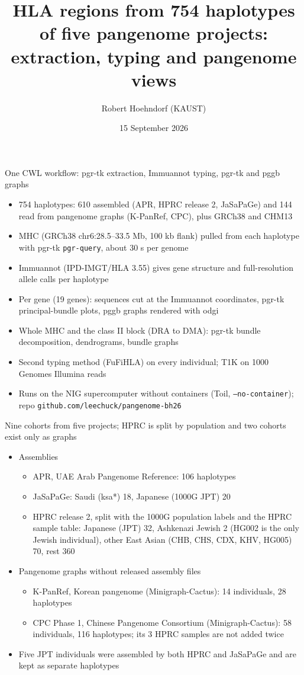 \documentclass[aspectratio=169,11pt]{beamer}
\title{HLA regions from 754 haplotypes of five pangenome projects: extraction, typing and pangenome views}
\author{Robert Hoehndorf (KAUST)}
\institute{BioHackathon Japan 2026, HLA/pangenome group}
\date{15 September 2026}
\begin{document}
\begin{frame}
  \titlepage
\end{frame}

\begin{frame}{One CWL workflow: pgr-tk extraction, Immuannot typing, pgr-tk and pggb graphs}
  \begin{itemize}
    \item 754 haplotypes: 610 assembled (APR, HPRC release 2, JaSaPaGe) and 144 read from pangenome graphs (K-PanRef, CPC), plus GRCh38 and CHM13
    \item MHC (GRCh38 chr6:28.5--33.5 Mb, 100 kb flank) pulled from each haplotype with pgr-tk \texttt{pgr-query}, about 30 s per genome
    \item Immuannot (IPD-IMGT/HLA 3.55) gives gene structure and full-resolution allele calls per haplotype
    \item Per gene (19 genes): sequences cut at the Immuannot coordinates, pgr-tk principal-bundle plots, pggb graphs rendered with odgi
    \item Whole MHC and the class II block (DRA to DMA): pgr-tk bundle decomposition, dendrograms, bundle graphs
    \item Second typing method (FuFiHLA) on every individual; T1K on 1000 Genomes Illumina reads
    \item Runs on the NIG supercomputer without containers (Toil, \texttt{--no-container}); repo \texttt{github.com/leechuck/pangenome-bh26}
  \end{itemize}
\end{frame}

\begin{frame}{Nine cohorts from five projects; HPRC is split by population and two cohorts exist only as graphs}
  \begin{itemize}
    \item Assemblies
    \begin{itemize}
      \item APR, UAE Arab Pangenome Reference: 106 haplotypes
      \item JaSaPaGe: Saudi (ksa*) 18, Japanese (1000G JPT) 20
      \item HPRC release 2, split with the 1000G population labels and the HPRC sample table: Japanese (JPT) 32, Ashkenazi Jewish 2 (HG002 is the only Jewish individual), other East Asian (CHB, CHS, CDX, KHV, HG005) 70, rest 360
    \end{itemize}
    \item Pangenome graphs without released assembly files
    \begin{itemize}
      \item K-PanRef, Korean pangenome (Minigraph-Cactus): 14 individuals, 28 haplotypes
      \item CPC Phase 1, Chinese Pangenome Consortium (Minigraph-Cactus): 58 individuals, 116 haplotypes; its 3 HPRC samples are not added twice
    \end{itemize}
    \item Five JPT individuals were assembled by both HPRC and JaSaPaGe and are kept as separate haplotypes
  \end{itemize}
\end{frame}
\end{document}
